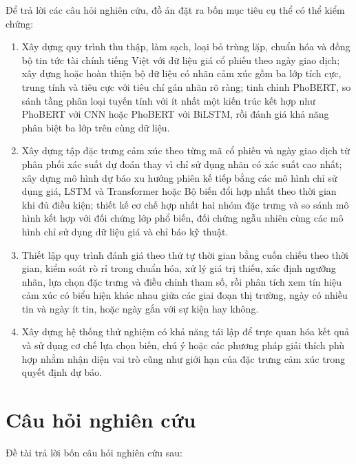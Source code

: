 Để trả lời các câu hỏi nghiên cứu, đồ án đặt ra bốn mục tiêu cụ thể có thể kiểm chứng:

\begin{enumerate}[nosep]
  \item Xây dựng quy trình thu thập, làm sạch, loại bỏ trùng lặp,
    chuẩn hóa và đồng bộ tin tức tài chính tiếng Việt với dữ liệu giá cổ phiếu theo ngày
    giao dịch; xây dựng hoặc hoàn thiện bộ dữ liệu có nhãn cảm xúc gồm ba lớp tích cực,
    trung tính và tiêu cực với tiêu chí gán nhãn rõ ràng; tinh chỉnh PhoBERT, so sánh tầng phân loại
    tuyến tính với ít nhất một kiến trúc kết hợp như PhoBERT với CNN hoặc PhoBERT với
    BiLSTM, rồi đánh giá khả năng phân biệt ba lớp trên cùng dữ liệu.
  \item Xây dựng tập đặc trưng cảm xúc theo từng mã cổ phiếu và ngày
    giao dịch từ phân phối xác suất dự đoán thay vì chỉ sử dụng nhãn có xác suất cao nhất;
    xây dựng mô hình dự báo xu hướng phiên kế tiếp bằng các mô hình chỉ sử dụng giá, LSTM
    và Transformer hoặc Bộ biến đổi hợp nhất theo thời gian khi đủ điều kiện; thiết kế cơ chế hợp
    nhất hai nhóm đặc trưng và so sánh mô hình kết hợp với đối chứng lớp phổ biến, đối chứng ngẫu nhiên cùng các mô
    hình chỉ sử dụng dữ liệu giá và chỉ báo kỹ thuật.
  \item Thiết lập quy trình đánh giá theo thứ tự thời gian bằng cuốn chiếu theo thời
    gian, kiểm soát rò rỉ trong chuẩn hóa, xử lý giá trị thiếu, xác định ngưỡng nhãn,
    lựa chọn đặc trưng và điều chỉnh tham số, rồi phân tích xem tín hiệu cảm xúc có biểu
    hiện khác nhau giữa các giai đoạn thị trường, ngày có nhiều tin và ngày ít tin, hoặc
    ngày gắn với sự kiện hay không.
  \item Xây dựng hệ thống thử nghiệm có khả năng tái lập để trực quan hóa
    kết quả và sử dụng cơ chế lựa chọn biến, chú ý hoặc các phương pháp giải thích phù
    hợp nhằm nhận diện vai trò cũng như giới hạn của đặc trưng cảm xúc trong quyết định dự
    báo.
\end{enumerate}

\section{Câu hỏi nghiên cứu}

Đề tài trả lời bốn câu hỏi nghiên cứu sau:

